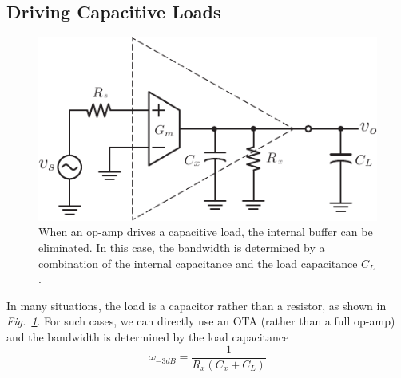 \subsection{Driving Capacitive Loads}
\begin{figure}[tb]
\centering
\includegraphics[scale=1]{ota_amp_capload}
\caption{When an op-amp drives a capacitive load, the internal buffer can be eliminated.  In this case, the bandwidth is determined by a combination of the internal capacitance and the load capacitance $C_L$.}
\label{fig:ota_amp_capload}
\end{figure}
In many situations, the load is a capacitor rather than a resistor, as shown in \emph{Fig.~\ref{fig:ota_amp_capload}}.
For such cases, we can directly use an OTA (rather than a full op-amp) and the bandwidth is determined by the load capacitance
    \begin{equation}
        {\omega _{ - 3dB}} = \frac{1}{{{R_x}({C_x} + {C_L})}}
    \end{equation}
%
%

